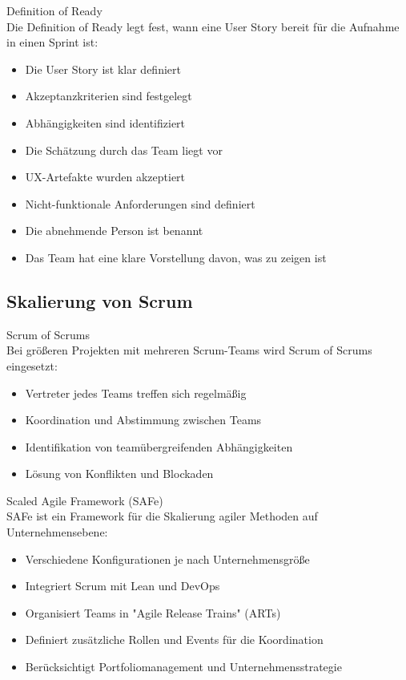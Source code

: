 \begin{definition}{Definition of Ready}\\
    Die Definition of Ready legt fest, wann eine User Story bereit für die Aufnahme in einen Sprint ist:
    \begin{itemize}
        \item Die User Story ist klar definiert
        \item Akzeptanzkriterien sind festgelegt
        \item Abhängigkeiten sind identifiziert
        \item Die Schätzung durch das Team liegt vor
        \item UX-Artefakte wurden akzeptiert
        \item Nicht-funktionale Anforderungen sind definiert
        \item Die abnehmende Person ist benannt
        \item Das Team hat eine klare Vorstellung davon, was zu zeigen ist
    \end{itemize}
\end{definition}

\subsection{Skalierung von Scrum}

\begin{concept}{Scrum of Scrums}\\
    Bei größeren Projekten mit mehreren Scrum-Teams wird Scrum of Scrums eingesetzt:
    \begin{itemize}
        \item Vertreter jedes Teams treffen sich regelmäßig
        \item Koordination und Abstimmung zwischen Teams
        \item Identifikation von teamübergreifenden Abhängigkeiten
        \item Lösung von Konflikten und Blockaden
    \end{itemize}
\end{concept}

\begin{concept}{Scaled Agile Framework (SAFe)}\\
    SAFe ist ein Framework für die Skalierung agiler Methoden auf Unternehmensebene:
    \begin{itemize}
        \item Verschiedene Konfigurationen je nach Unternehmensgröße
        \item Integriert Scrum mit Lean und DevOps
        \item Organisiert Teams in "Agile Release Trains" (ARTs)
        \item Definiert zusätzliche Rollen und Events für die Koordination
        \item Berücksichtigt Portfoliomanagement und Unternehmensstrategie
    \end{itemize}
\end{concept}

